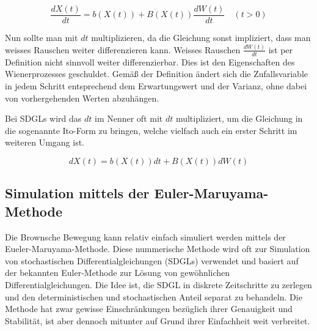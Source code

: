 \begin{equation}
	\frac{dX(t)}{dt} = b(X(t)) + B(X(t)) \frac{dW(t)}{dt} \quad (t>0)
\end{equation}

Nun sollte man mit $ dt $  multiplizieren, da die Gleichung sonst impliziert, dass man weisses Rauschen weiter differenzieren kann. Weisses Rauschen $ \frac{dW(t)}{dt} $ ist per Definition nicht sinnvoll weiter differenzierbar. Dies ist den Eigenschaften des Wienerprozesses geschuldet. Gemäß der Definition ändert sich die Zufallsvariable in jedem Schritt entsprechend dem Erwartungswert und der Varianz, ohne dabei von vorhergehenden Werten abzuhängen.

Bei SDGLs wird das $ dt $ im Nenner oft mit $ dt $ multipliziert, um die Gleichung in die sogenannte \glqq{}Ito-Form\glqq{} zu bringen, welche vielfach auch ein erster Schritt im weiteren Umgang ist.

\begin{equation}
	dX(t) = b(X(t)) dt + B(X(t)) dW(t)
\end{equation}




\subsection{Simulation mittels der Euler-Maruyama-Methode
	\label{brown:Simulation}}

Die Brownsche Bewegung kann relativ einfach simuliert werden mittels der Eueler-Maruyama-Methode. Diese nummerische Methode wird oft zur Simulation von stochastischen Differentialgleichungen (SDGLs) verwendet und basiert auf der bekannten Euler-Methode zur Lösung von gewöhnlichen Differentialgleichungen. Die Idee ist, die SDGL in diskrete Zeitschritte zu zerlegen und den deterministischen und stochastischen Anteil separat zu behandeln. Die Methode hat zwar gewisse Einschränkungen bezüglich ihrer Genauigkeit und Stabilität, ist aber dennoch mitunter auf Grund ihrer Einfachheit weit verbreitet.



